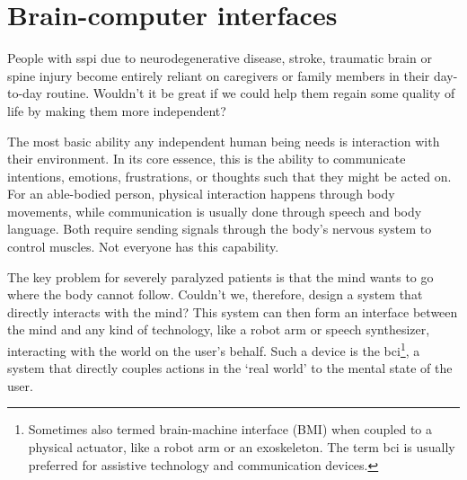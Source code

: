 \chapter{Brain-computer interfaces}
\label{sec:bci}


People with \ac{sspi} due to neurodegenerative disease, stroke, traumatic brain or spine
injury become entirely reliant on caregivers or family members in their day-to-day
routine.
Wouldn't it be great if we could help them regain some quality of life by making them
more independent?

The most basic ability any independent human being needs is interaction with their
environment.
In its core essence, this is the ability to communicate intentions, emotions,
frustrations, or thoughts such that they might be acted on.
For an able-bodied person, physical interaction happens through body movements, while
communication is usually done through speech and body language.
Both require sending signals through the body's nervous system to control muscles.
Not everyone has this capability.

The key problem for severely paralyzed patients is that the mind wants to go where the
body cannot follow.
Couldn't we, therefore, design a system that directly interacts with the mind?
This system can then form an interface between the mind and any kind of technology, like
a robot arm or speech synthesizer, interacting with the world on the user's behalf.
Such a device is the \ac{bci}\footnote{Sometimes also termed brain-machine interface
(BMI) when coupled to a physical actuator, like a robot arm or an exoskeleton.
The term \ac{bci} is usually preferred for assistive technology and communication
devices.}, a system that directly couples actions in the `real world' to the mental state
of the user.

